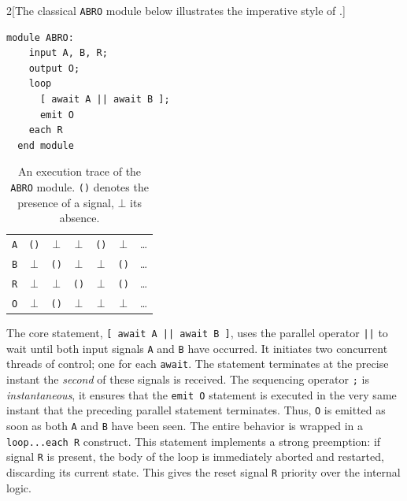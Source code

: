 \begin{multicols}{2}[The classical \texttt{ABRO} module below illustrates the imperative style of
    \Esterel.]
  \begin{lstlisting}[basicstyle=\ttfamily\footnotesize\color{BlackText}]
  module ABRO:
    input A, B, R;
    output O;
    loop
      [ await A || await B ];
      emit O
    each R
  end module
\end{lstlisting}

  \newcolumn

  \hfill

  \begin{table}[H]
    \centering
    \begin{tabular}{l|cccccc}
      \texttt{A} & \texttt{()} & $\bot$      & $\bot$      & \texttt{()} & $\bot$      & \dots \\
      \texttt{B} & $\bot$      & \texttt{()} & $\bot$      & $\bot$      & \texttt{()} & \dots \\
      \texttt{R} & $\bot$      & $\bot$      & \texttt{()} & $\bot$      & \texttt{()} & \dots \\
      \texttt{O} & $\bot$      & \texttt{()} & $\bot$      & $\bot$      & $\bot$      & \dots \\
    \end{tabular}
    \caption[An execution trace of the \texttt{ABRO} module.]%
    {An execution trace of the \texttt{ABRO} module. \texttt{()} denotes the presence of a signal,
      $\bot$ its absence.}
    \label{tab:sota:synchronous:esterel:exec}
  \end{table}
\end{multicols}

The core statement, \texttt{[ await A || await B ]}, uses the parallel operator \texttt{||} to wait
until both input signals \texttt{A} and \texttt{B} have occurred. It initiates two concurrent
threads of control; one for each \texttt{await}. The statement terminates at the precise instant the
\emph{second} of these signals is received. The sequencing operator \texttt{;} is
\emph{instantaneous}, it ensures that the \texttt{emit O} statement is executed in the very same
instant that the preceding parallel statement terminates. Thus, \texttt{O} is emitted as soon as
both \texttt{A} and \texttt{B} have been seen. The entire behavior is wrapped in a
\texttt{loop...each R} construct. This statement implements a strong preemption: if signal
\texttt{R} is present, the body of the loop is immediately aborted and restarted, discarding its
current state. This gives the reset signal \texttt{R} priority over the internal logic.

